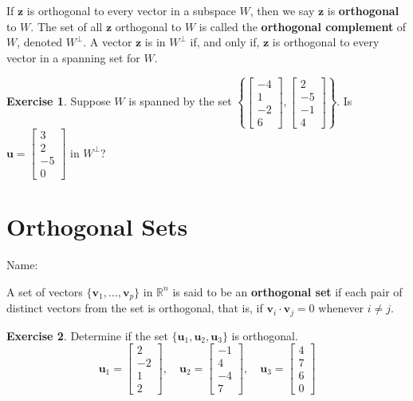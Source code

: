 \documentclass[10pt]{book}
\newcommand{\boxcolor}{gray!30}
\newenvironment{boxme}{\begin{mdframed}[backgroundcolor=\boxcolor,linewidth=0pt,nobreak=true]}{\end{mdframed}}
\newenvironment{boxdef}{\begin{mdframed}[backgroundcolor=\boxcolor,linewidth=0pt,nobreak=true]}{\end{mdframed}}
\theoremstyle{definition}
\newtheorem{exercise}{Exercise}[section]
\newcommand{\name}[1][2.5in]{\vspace{-2.3em}\hfill Name: \underline{\hspace{#1}}}
\newcommand{\R}{\mathbb{R}}
\newcommand{\vect}[1]{\ensuremath{\boldsymbol{\mathbf{#1}}}}
\newcommand{\vectsetvp}{\{\vect{v}_1,\ldots,\vect{v}_p\}}
\begin{document}
\begin{boxdef}
	If $\vect{z}$ is orthogonal to every vector in a subspace $W$, then we say $\vect{z}$ is \textbf{orthogonal} to $W$. The set of all $\vect{z}$ orthogonal to $W$ is called the \textbf{orthogonal complement} of $W$, denoted $W^\perp$. A vector $\vect{z}$ is in $W^\perp$ if, and only if, $\vect{z}$ is orthogonal to every vector in a spanning set for $W$.
\end{boxdef}

\begin{exercise} %
	Suppose $W$ is spanned by the set $\left\{ \begin{bmatrix}-4\\1\\-2\\6\end{bmatrix},\begin{bmatrix}2\\-5\\-1\\4\end{bmatrix} \right\}$. Is $\vect{u}=\begin{bmatrix}3\\2\\-5\\0\end{bmatrix}$ in $W^\perp$?
\end{exercise}
\vfill


\newpage


\section{Orthogonal Sets}
\name

\begin{boxme}
	A set of vectors $\vectsetvp$ in $\R^n$ is said to be an \textbf{orthogonal set} if each pair of distinct vectors from the set is orthogonal, that is, if $\vect{v}_i\cdot\vect{v}_j=0$ whenever $i\neq j$.
\end{boxme}


\begin{exercise} %
	Determine if the set $\{\vect{u}_1,\vect{u}_2,\vect{u}_3\}$ is orthogonal.
	$$ \vect{u}_1 = \begin{bmatrix}2\\-2\\1\\2\end{bmatrix}, \quad
	\vect{u}_2 = \begin{bmatrix}-1\\4\\-4\\7\end{bmatrix}, \quad
	\vect{u}_3 = \begin{bmatrix}4\\7\\6\\0\end{bmatrix} $$
\end{exercise}
\vfill
\end{document}
